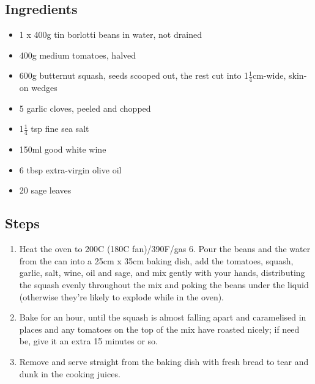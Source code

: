 \documentclass{book}
\begin{document}
\subsection*{Ingredients}
\begin{itemize}
\item 1 x 400g tin borlotti beans in water, not drained
\item 400g medium tomatoes, halved
\item 600g butternut squash, seeds scooped out, the rest cut into 1$\frac{1}{4}$cm-wide, skin-on wedges
\item 5 garlic cloves, peeled and chopped
\item 1$\frac{1}{4}$ tsp fine sea salt
\item 150ml good white wine
\item 6 tbsp extra-virgin olive oil
\item 20 sage leaves
\end{itemize}

\subsection*{Steps}
\begin{enumerate}
\item Heat the oven to 200C (180C fan)/390F/gas 6. Pour the beans and the water from the can into a 25cm x 35cm baking dish, add the tomatoes, squash, garlic, salt, wine, oil and sage, and mix gently with your hands, distributing the squash evenly throughout the mix and poking the beans under the liquid (otherwise they’re likely to explode while in the oven).
\item Bake for an hour, until the squash is almost falling apart and caramelised in places and any tomatoes on the top of the mix have roasted nicely; if need be, give it an extra 15 minutes or so.
\item Remove and serve straight from the baking dish with fresh bread to tear and dunk in the cooking juices.
\end{enumerate}
\newpage
\end{document}
